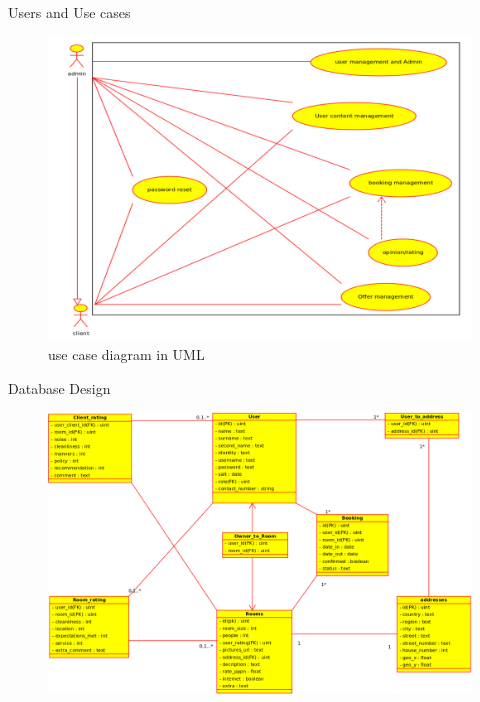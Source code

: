 \documentclass[11pt]{beamer}
\begin{document}
\begin{frame}{Users and Use cases}
	\begin{figure}
		\includegraphics[scale=0.2]{../img/updated_use_case.jpg} 
		\caption{use case diagram in UML}
	\end{figure}
\end{frame}

\begin{frame}{Database Design}
\begin{figure}
\includegraphics[scale=0.25]{../img/db.png} 
\end{figure}

\end{frame}
\end{document}

